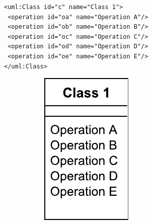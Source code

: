 \documentclass{llncs}
\begin{document}
\begin{minipage}[t]{0.59\linewidth} 
\centering
\begin{lstlisting}[style=eol,caption={The simplified XMI of the model in Fig. \ref{fig:origin}.},label=lst:originxmi]
<uml:Class id="c" name="Class 1">
 <operation id="oa" name="Operation A"/>
 <operation id="ob" name="Operation B"/>
 <operation id="oc" name="Operation C"/>
 <operation id="od" name="Operation D"/>
 <operation id="oe" name="Operation E"/>
</uml:Class>
\end{lstlisting}
\vspace{-25pt}
\begin{figure}[H]
\centering    
\hfill
\begin{subfigure}[t]{0.2\linewidth}
    \centering
    \includegraphics[width=\linewidth]{images/OriginalClassDiagram}

\end{subfigure}
\end{figure}
\end{minipage}
\end{document}
